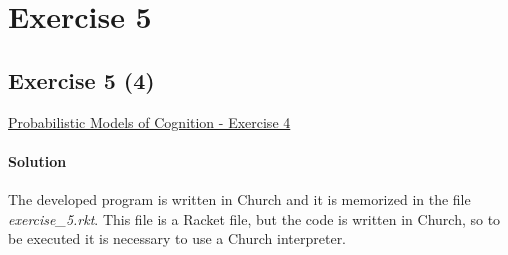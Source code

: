 \section*{Exercise 5}

\subsection*{Exercise 5 (4)}
\href{http://v1.probmods.org/conditioning.html#exercises}{Probabilistic Models of Cognition - Exercise 4}

\paragraph{Solution}
The developed program is written in Church and it is memorized in the file \textit{exercise\_5.rkt}. This file is a Racket file, but 
the code is written in Church, so to be executed it is necessary to use a Church interpreter.

